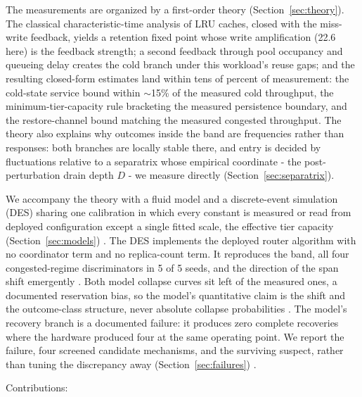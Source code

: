 The measurements are organized by a first-order theory (Section~\ref{sec:theory}).
The classical characteristic-time analysis of LRU caches, closed
with the miss-write feedback, yields a retention fixed point whose
write amplification (22.6 here) is the feedback strength; a second
feedback through pool occupancy and queueing delay creates the cold
branch under this workload's reuse gaps; and the resulting
closed-form estimates land within tens of percent of measurement:
the cold-state service bound within $\sim$15\% of the measured cold
throughput, the minimum-tier-capacity rule bracketing the measured
persistence boundary, and the restore-channel bound matching the
measured congested throughput. The theory also explains why outcomes
inside the band are frequencies rather than responses: both branches
are locally stable there, and entry is decided by fluctuations
relative to a separatrix whose empirical coordinate - the
post-perturbation drain depth $D$ - we measure directly (Section~\ref{sec:separatrix}).

We accompany the theory with a fluid model and a discrete-event
simulation (DES) sharing one calibration in which every constant is
measured or read from deployed configuration except a single fitted
scale, the effective tier capacity (Section~\ref{sec:models}) . The DES
implements the deployed router algorithm with no coordinator term
and no replica-count term. It reproduces the band, all four
congested-regime discriminators in 5 of 5 seeds, and the direction
of the span shift emergently . Both model collapse curves sit
left of the measured ones, a documented reservation bias, so the
model's quantitative claim is the shift and the outcome-class
structure, never absolute collapse probabilities . The model's
recovery branch is a documented failure: it produces zero complete
recoveries where the hardware produced four at the same operating
point. We report the failure, four screened candidate mechanisms,
and the surviving suspect, rather than tuning the discrepancy away
(Section~\ref{sec:failures}) .

Contributions:

